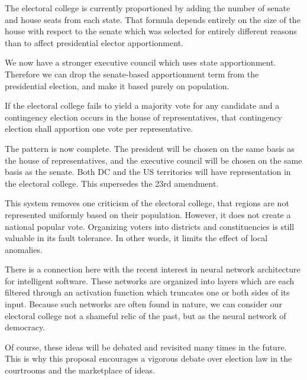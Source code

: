 \documentclass{article}
\begin{document}
The electoral college is currently proportioned by adding the number of senate and house seats from each state. That formula depends entirely on the size of the house with respect to the senate which was selected for entirely different reasons than to affect presidential elector apportionment.

We now have a stronger executive council which uses state apportionment. Therefore we can drop the senate-based apportionment term from the presidential election, and make it based purely on population.

\begin{quoting}
If the electoral college fails to yield a majority vote for any candidate and a contingency election occurs in the house of representatives, that contingency election shall apportion one vote per representative.
\end{quoting}

The pattern is now complete. The president will be chosen on the same basis as the house of representatives, and the executive council will be chosen on the same basis as the senate. Both DC and the US territories will have representation in the electoral college. This supersedes the 23rd amendment.

This system removes one criticism of the electoral college, that regions are not represented uniformly based on their population. However, it does not create a national popular vote. Organizing voters into districts and constituencies is still valuable in its fault tolerance. In other words, it limits the effect of local anomalies.

There is a connection here with the recent interest in neural network architecture for intelligent software. These networks are organized into layers which are each filtered through an activation function which truncates one or both sides of its input. Because such networks are often found in nature, we can consider our electoral college not a shameful relic of the past, but as the neural network of democracy.

Of course, these ideas will be debated and revisited many times in the future. This is why this proposal encourages a vigorous debate over election law in the courtrooms and the marketplace of ideas.
\end{document}
